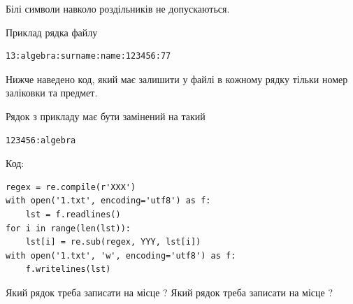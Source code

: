 \documentclass[12pt, ukrainian]{article}
\begin{document}
{Білі символи навколо роздільників не допускаються.

Приклад рядка файлу



\begin{verbatim}
13:algebra:surname:name:123456:77
\end{verbatim}


Нижче наведено код, який має залишити у файлі в кожному рядку тільки номер заліковки та предмет.

Рядок з прикладу має бути замінений на такий



\begin{verbatim}
123456:algebra
\end{verbatim}




Код:



\begin{verbatim}
regex = re.compile(r'XXX')
with open('1.txt', encoding='utf8') as f:
    lst = f.readlines()
for i in range(len(lst)):
    lst[i] = re.sub(regex, YYY, lst[i])
with open('1.txt', 'w', encoding='utf8') as f:
    f.writelines(lst)
\end{verbatim}







Який рядок треба записати на місце  ?
Який рядок треба записати на місце  ?\par

}
\newpage
\end{document}
